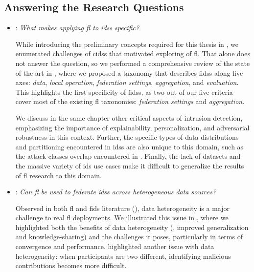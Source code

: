 \subsection{Answering the Research Questions\label{sec:conclusion.contribs.answers}}

\begin{itemize}[listparindent=\parindent,itemsep=.6\baselineskip]

  \item {}: \emph{What makes applying \gls{fl} to \glspl{ids} specific?}

  While introducing the preliminary concepts required for this thesis in , we enumerated challenges of \glspl{cids} that motivated exploring of \gls{fl}.
  That alone does not answer the question, so we performed a comprehensive review of the state of the art in , where we proposed a taxonomy that describes \glspl{fids} along five axes: \emph{data}, \emph{local operation}, \emph{federation settings}, \emph{aggregation}, and \emph{evaluation}.
  This highlights the first specificity of \glspl{fids}, as two out of our five criteria cover most of the existing \gls{fl} taxonomies: \emph{federation settings} and \emph{aggregation}.
  
  We discuss in the same chapter other critical aspects of intrusion detection, emphasizing the importance of explainability, personalization, and adversarial robustness in this context.
  Further, the specific types of data distributions and partitioning encountered in \glspl{ids} are also unique to this domain, such as the attack classes overlap encountered in .
  Finally, the lack of datasets and the massive variety of \gls{ids} use cases make it difficult to generalize the results of \gls{fl} research to this domain.
  

  \item {}: \emph{Can \gls{fl} be used to federate \glspl{ids} across heterogeneous data sources?}
  
  Observed in both \gls{fl} and \gls{fids} literature (\cf {}), data heterogeneity is a major challenge to real \gls{fl} deployments.
  We illustrated this issue in , where we highlighted both the benefits of data heterogeneity (\eg, improved generalization and knowledge-sharing) and the challenges it poses, particularly in terms of convergence and performance.
   highlighted another issue with data heterogeneity: when participants are two different, identifying malicious contributions becomes more difficult.


\end{itemize}

